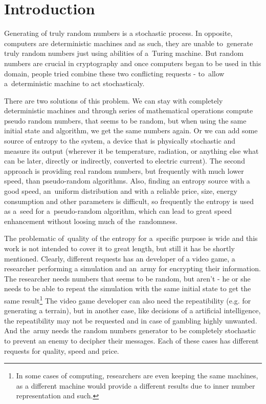 \chapter{Introduction}
Generating of truly random numbers is a stochastic process. In opposite, computers are deterministic machines and as such, they are unable to~generate truly random numbers just using abilities of a~Turing machine.  %
But random numbers are crucial in cryptography and once computers began to be used in this domain,  %
people tried combine these two conflicting requests - to~allow a~deterministic machine to act stochasticaly. 

There are two solutions of this problem. We can stay with completely deterministic machines and through series of mathematical operations compute pseudo random numbers, that seems to be random, but when using the same initial state and algorithm, we get the same numbers again. Or we can add some source of entropy to the system, a device that is physically stochastic and measure its output (wherever it be temperature, radiation, or anything else what can be later, directly or indirectly, converted to electric current). The second approach is providing real random numbers, but frequently with much lower speed, than pseudo-random algorithms. Also, finding an entropy source with a good speed, an~uniform distribution and with a reliable price, size, energy consumption and other parameters is difficult, so frequently the entropy is used as a~seed for a~pseudo-random algorithm, which can lead to great speed enhancement without loosing much of the~randomness.

The problematic of~quality of the entropy for a~specific purpose is wide and this work is not intended to cover it to great length, but still it has be shortly mentioned. Clearly, different requests has an developer of a video game, a researcher performing a simulation and an~army for encrypting their information. The researcher needs numbers that seems to be random, but aren't - he or she needs to be able to repeat the simulation with the same initial state to get the same result\footnote{In some cases of computing, researchers are even keeping the same machines, as a different machine would provide a different results due to inner number representation and such.}%
The video game developer can also need the repeatibility (e.g. for generating a terrain), but in another case, like decisions of a artificial intelligence, the repeatibility may not be requested and in case of gambling highly unwanted. And the~army needs the random numbers generator to be completely stochastic to prevent an enemy to decipher their messages. Each of these cases has different requests for quality, speed and price.

